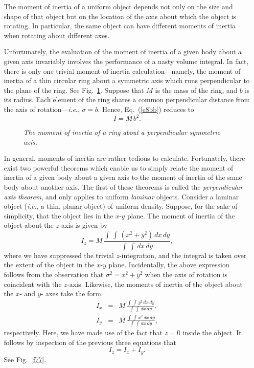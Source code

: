 The moment of inertia of a uniform  object depends not only on the size and shape of that
object but on the location of the axis about which the object is rotating. In particular,
the same object can have  different moments of inertia when rotating about 
different axes. 

Unfortunately, the evaluation of the moment of inertia of a given body about a given axis invariably
involves the performance of a nasty volume integral. In fact, there is only
one trivial moment of inertia calculation---namely, the moment of inertia of a thin
circular ring about a symmetric axis    which runs perpendicular
to the plane of the ring. See Fig.~\ref{f76}. Suppose that $M$ is the mass of the ring, and
$b$ is its radius. Each element of the ring shares a common perpendicular distance from
the axis of rotation---{\em i.e.}, $\sigma=b$. Hence, Eq.~(\ref{e8bb})
reduces to 
\begin{equation}
I = M\,b^2.
\end{equation}

\begin{figure}
\epsfysize=2in
\centerline{}
\caption{\em The moment of inertia of a ring about a perpendicular symmetric axis.}\label{f76}  
\end{figure}

In general, moments of inertia are rather tedious to calculate. Fortunately, there exist 
two powerful theorems which enable us to simply relate the moment of inertia of a given body
about a given axis to the moment of inertia of the same body about another axis. The first of
these theorems is called the {\em perpendicular axis theorem}, and only applies to
uniform {\em laminar} objects. Consider a laminar object ({\em i.e.}, a thin, planar object)
of uniform density. Suppose, for the sake of simplicity,
 that the object lies in the $x$-$y$ plane. The moment of inertia of the object about the
$z$-axis is given by
\begin{equation}
I_z = M\,\frac{\int\,\int\, (x^2+y^2)\,dx\,dy}{\int\,\int\,dx\,dy},
\end{equation}
where we have suppressed the trivial $z$-integration, and the integral is taken
over the extent of the object in the $x$-$y$ plane.  Incidentally, the
above expression follows from the observation that $\sigma^2 = x^2+y^2$
when the axis of rotation is coincident with the $z$-axis. Likewise, the moments of 
inertia of the object about the $x$- and $y$- axes take the form
\begin{eqnarray}
I_x & =& M\,\frac{\int\,\int\, y^2\,dx\,dy}{\int\,\int\,dx\,dy},\\[0.5ex]
I_y & =& M\,\frac{\int\,\int\, x^2\,dx\,dy}{\int\,\int\,dx\,dy},
\end{eqnarray}
respectively.
Here, we have made use of the fact that $z=0$ inside the object. It follows by inspection
of the previous three equations that
\begin{equation}
I_z = I_x + I_y.
\end{equation}
See Fig.~\ref{f77}. 

